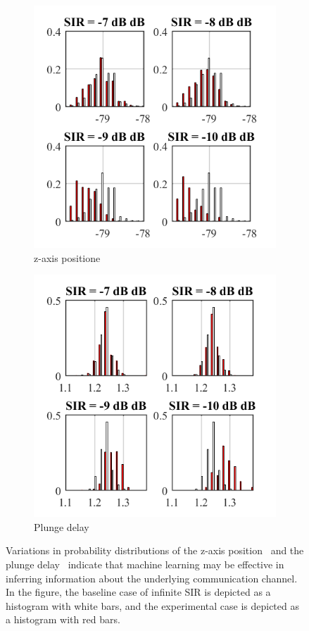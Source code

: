 \begin{figure}[!ht]
	\centering
	\begin{subfigure}{.5\textwidth}
		\centering
		\includegraphics[width=.8\linewidth]{./chapter-ftml/plots/ZPosHists}  
		\caption{z-axis positione}
		\label{ftml-conf:fig:results-zpos-hist}
	\end{subfigure}
	\begin{subfigure}{.5\textwidth}
		\centering
		\includegraphics[width=.8\linewidth]{./chapter-ftml/plots/DeltaTbc.png}  
		\caption{Plunge delay}
		\label{ftml-conf:fig:results-dtbc-hist}
	\end{subfigure}
	\caption{Variations in probability distributions of the z-axis position~\protect{} and the plunge delay~\protect{} indicate that machine learning may be effective in inferring information about the underlying communication channel. In the figure, the baseline case of infinite SIR is depicted as a histogram with white bars, and the experimental case is depicted as a histogram with red bars.}
	\label{ftml-conf:fig:results-hists}
\end{figure}




